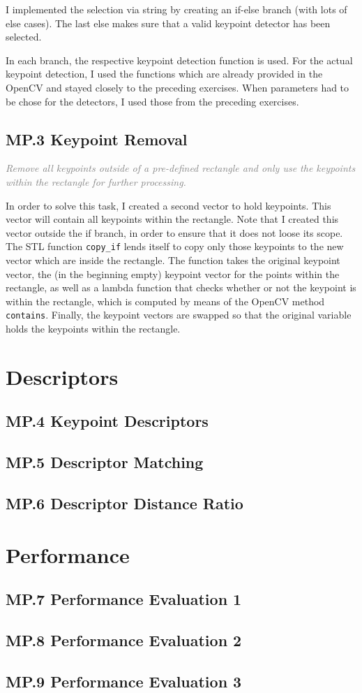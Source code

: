 \documentclass[a4paper]{scrartcl}
\begin{document}
I implemented the selection via string by creating an if-else branch (with lots of else cases).
The last else makes sure that a valid keypoint detector has been selected.

In each branch, the respective keypoint detection function is used.
For the actual keypoint detection, I used the functions which are already provided in the OpenCV
and stayed closely to the preceding exercises.
When parameters had to be chose for the detectors, I used those from the preceding exercises.

\subsection*{MP.3 Keypoint Removal}
\textcolor{gray}{\textit{Remove all keypoints outside of a pre-defined rectangle and only use the keypoints within the rectangle for further processing.}}

In order to solve this task, I created a second vector to hold keypoints.
This vector will contain all keypoints within the rectangle.
Note that I created this vector outside the if branch, in order to ensure that it does not
loose its scope.
The STL function \texttt{copy\_if} lends itself to copy only those keypoints to the new vector
which are inside the rectangle.
The function takes the original keypoint vector, the (in the beginning empty) keypoint vector
for the points within the rectangle, as well as a lambda function that checks whether or
not the keypoint is within the rectangle, which is computed by means of the OpenCV method \texttt{contains}.
Finally, the keypoint vectors are swapped so that the original variable holds the keypoints
within the rectangle.

\section*{Descriptors}
\subsection*{MP.4 Keypoint Descriptors}
\subsection*{MP.5 Descriptor Matching}
\subsection*{MP.6 Descriptor Distance Ratio}

\section*{Performance}
\subsection*{MP.7 Performance Evaluation 1}
\subsection*{MP.8 Performance Evaluation 2}
\subsection*{MP.9 Performance Evaluation 3}
\end{document}
